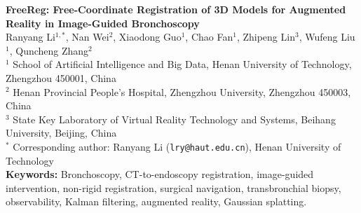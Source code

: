 \documentclass[11pt]{article}
\begin{document}
\begin{center}
{\LARGE\bfseries FreeReg: Free-Coordinate Registration of 3D Models for Augmented Reality in Image-Guided Bronchoscopy}\\[1.2em]

Ranyang Li$^{1,\ast}$,
Nan Wei$^{2}$,
Xiaodong Guo$^{1}$,
Chao Fan$^{1}$,
Zhipeng Lin$^{3}$,
Wufeng Liu$^{1}$,
Quncheng Zhang$^{2}$\\[1em]

{\small
$^{1}$ School of Artificial Intelligence and Big Data, Henan University of Technology, Zhengzhou 450001, China\\
$^{2}$ Henan Provincial People's Hospital, Zhengzhou University, Zhengzhou 450003, China\\
$^{3}$ State Key Laboratory of Virtual Reality Technology and Systems, Beihang University, Beijing, China
}\\[1em]

{\small
$^{\ast}$ Corresponding author: Ranyang Li (\texttt{lry@haut.edu.cn}), Henan University of Technology
}\\[1.5em]

{\small\textbf{Keywords:} Bronchoscopy, CT-to-endoscopy registration, image-guided intervention, non-rigid registration, surgical navigation, transbronchial biopsy, observability, Kalman filtering, augmented reality, Gaussian splatting.}
\end{center}
\end{document}
